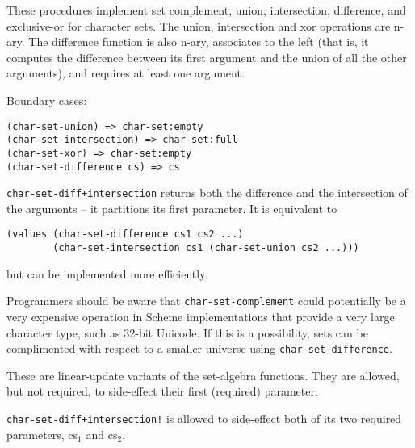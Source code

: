 \begin{entry}{%
  } 

  These procedures implement
  set complement, union, intersection, difference, and exclusive-or
  for character sets. The union, intersection and xor operations are
  n-ary. The difference function is also n-ary, associates to the left
  (that is, it computes the difference between its first argument and
  the union of all the other arguments), and requires at least one
  argument.

  Boundary cases:

\begin{verbatim}
(char-set-union) => char-set:empty
(char-set-intersection) => char-set:full
(char-set-xor) => char-set:empty
(char-set-difference cs) => cs
\end{verbatim}

  \texttt{char-set-diff+intersection} returns both the difference and
  the intersection of the arguments -- it partitions its first
  parameter. It is equivalent to

\begin{verbatim}
(values (char-set-difference cs1 cs2 ...)
        (char-set-intersection cs1 (char-set-union cs2 ...)))
\end{verbatim}

  but can be implemented more efficiently.

  Programmers should be aware that \texttt{char-set-complement} could
  potentially be a very expensive operation in Scheme implementations
  that provide a very large character type, such as 32-bit Unicode. If
  this is a possibility, sets can be complimented with respect to a
  smaller universe using \texttt{char-set-difference}.
\end{entry}

\begin{entry}{%
  }

   These are linear-update variants of the set-algebra
  functions. They are allowed, but not required, to side-effect their
  first (required) parameter.

  \texttt{char-set-diff+intersection!} is allowed to side-effect both
  of its two required parameters, cs$_1$ and cs$_2$.


\end{entry}

